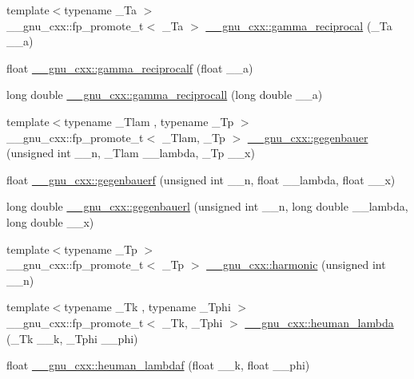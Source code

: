 \begin{DoxyCompactItemize}
\item 
{\footnotesize template$<$typename \+\_\+\+Ta $>$ }\\\+\_\+\+\_\+gnu\+\_\+cxx\+::fp\+\_\+promote\+\_\+t$<$ \+\_\+\+Ta $>$ \hyperlink{group__gnu__math__spec__func_ga641f9bcdb8fc32a9a0ce7a15b5040076}{\+\_\+\+\_\+gnu\+\_\+cxx\+::gamma\+\_\+reciprocal} (\+\_\+\+Ta \+\_\+\+\_\+a)
\item 
float \hyperlink{group__gnu__math__spec__func_ga10cccd5045490ac24590c094c43107d8}{\+\_\+\+\_\+gnu\+\_\+cxx\+::gamma\+\_\+reciprocalf} (float \+\_\+\+\_\+a)
\item 
long double \hyperlink{group__gnu__math__spec__func_ga73bfcace13daa8b50e7e7e3f583a2eb0}{\+\_\+\+\_\+gnu\+\_\+cxx\+::gamma\+\_\+reciprocall} (long double \+\_\+\+\_\+a)
\item 
{\footnotesize template$<$typename \+\_\+\+Tlam , typename \+\_\+\+Tp $>$ }\\\+\_\+\+\_\+gnu\+\_\+cxx\+::fp\+\_\+promote\+\_\+t$<$ \+\_\+\+Tlam, \+\_\+\+Tp $>$ \hyperlink{group__gnu__math__spec__func_ga512e7981e328d6184f604de1892048b6}{\+\_\+\+\_\+gnu\+\_\+cxx\+::gegenbauer} (unsigned int \+\_\+\+\_\+n, \+\_\+\+Tlam \+\_\+\+\_\+lambda, \+\_\+\+Tp \+\_\+\+\_\+x)
\item 
float \hyperlink{group__gnu__math__spec__func_ga3eda0a3546848c5b3a2d4d9b5910d6b1}{\+\_\+\+\_\+gnu\+\_\+cxx\+::gegenbauerf} (unsigned int \+\_\+\+\_\+n, float \+\_\+\+\_\+lambda, float \+\_\+\+\_\+x)
\item 
long double \hyperlink{group__gnu__math__spec__func_ga1f1110d7a116bd5636924bb96d24ecc3}{\+\_\+\+\_\+gnu\+\_\+cxx\+::gegenbauerl} (unsigned int \+\_\+\+\_\+n, long double \+\_\+\+\_\+lambda, long double \+\_\+\+\_\+x)
\item 
{\footnotesize template$<$typename \+\_\+\+Tp $>$ }\\\+\_\+\+\_\+gnu\+\_\+cxx\+::fp\+\_\+promote\+\_\+t$<$ \+\_\+\+Tp $>$ \hyperlink{group__gnu__math__spec__func_gab052b72af9c7ec030bcea81965390614}{\+\_\+\+\_\+gnu\+\_\+cxx\+::harmonic} (unsigned int \+\_\+\+\_\+n)
\item 
{\footnotesize template$<$typename \+\_\+\+Tk , typename \+\_\+\+Tphi $>$ }\\\+\_\+\+\_\+gnu\+\_\+cxx\+::fp\+\_\+promote\+\_\+t$<$ \+\_\+\+Tk, \+\_\+\+Tphi $>$ \hyperlink{group__gnu__math__spec__func_ga7537f96eedc8571ed1987481b2863e89}{\+\_\+\+\_\+gnu\+\_\+cxx\+::heuman\+\_\+lambda} (\+\_\+\+Tk \+\_\+\+\_\+k, \+\_\+\+Tphi \+\_\+\+\_\+phi)
\item 
float \hyperlink{group__gnu__math__spec__func_ga10cf5d54d985aa3a58cb197601040ac8}{\+\_\+\+\_\+gnu\+\_\+cxx\+::heuman\+\_\+lambdaf} (float \+\_\+\+\_\+k, float \+\_\+\+\_\+phi)

\end{DoxyCompactItemize}

